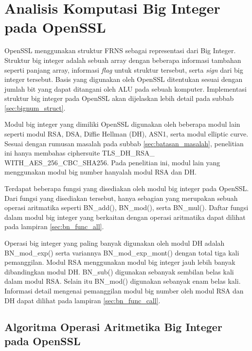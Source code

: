 \section{Analisis Komputasi Big Integer pada OpenSSL}


OpenSSL menggunakan struktur FRNS sebagai representasi dari Big Integer. Struktur big integer adalah sebuah array dengan beberapa informasi tambahan seperti panjang array, informasi \textit{flag} untuk struktur tersebut, serta \textit{sign} dari big integer tersebut. Basis yang digunakan oleh OpenSSL ditentukan sesuai dengan jumlah bit yang dapat ditangani oleh ALU pada sebuah komputer. Implementasi struktur big integer pada OpenSSL akan dijelaskan lebih detail pada subbab \ref{sec:bignum_struct}.

Modul big integer yang dimiliki OpenSSL digunakan oleh beberapa modul lain seperti modul RSA, DSA, Diffie Hellman (DH), ASN1, serta modul elliptic curve. Sesuai dengan rumusan masalah pada subbab \ref{sec:batasan_masalah}, penelitian ini hanya membahas ciphersuite TLS\_DH\_RSA\_ WITH\_AES\_256\_CBC\_SHA256. Pada penelitian ini, modul lain yang menggunakan modul big number hanyalah modul RSA dan DH.

Terdapat beberapa fungsi yang disediakan oleh modul big integer pada OpenSSL. Dari fungsi yang disediakan tersebut, hanya sebagian yang merupakan sebuah operasi aritmatika seperti BN\_add(), BN\_mod(), serta BN\_mul(). Daftar fungsi dalam modul big integer yang berkaitan dengan operasi aritmatika dapat dilihat pada lampiran \ref{sec:bn_func_all}.

Operasi big integer yang paling banyak digunakan oleh modul DH adalah BN\_mod\_exp() serta variannya BN\_mod\_exp\_mont() dengan total tiga kali pemanggilan. Modul RSA menggunakan modul big integer jauh lebih banyak dibandingkan modul DH. BN\_sub() digunakan sebanyak sembilan belas kali dalam modul RSA. Selain itu BN\_mod() digunakan sebanyak enam belas kali. Informasi detail mengenai pemanggilan modul big number oleh modul RSA dan DH dapat dilihat pada lampiran \ref{sec:bn_func_call}.

\subsection{Algoritma Operasi Aritmetika Big Integer pada OpenSSL}

